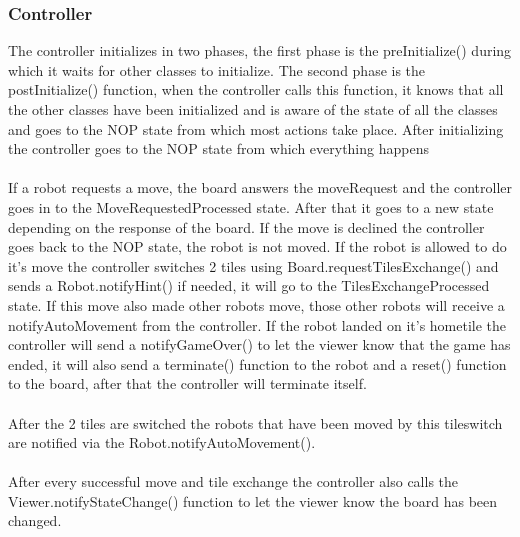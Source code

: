 	\subsubsection{Controller}
	The controller initializes in two phases, the first phase is the preInitialize() during which it waits for other classes to initialize. The second phase is the postInitialize() function, when the controller calls this function, it knows that all the other classes have been initialized and is aware of the state of all the classes and goes to the NOP state from which most actions take place. After initializing the controller goes to the NOP state from which everything happens\\
\\
If a robot requests a move, the board answers the moveRequest and the controller goes in to the MoveRequestedProcessed state. After that it goes to a new state depending on the response of the board. If the move is declined the controller goes back to the NOP state, the robot is not moved. If the robot is allowed to do it's move the controller switches 2 tiles using Board.requestTilesExchange() and sends a Robot.notifyHint() if needed, it will go to the TilesExchangeProcessed state. If this move also made other robots move, those other robots will receive a notifyAutoMovement from the controller. If the robot landed on it's hometile the controller will send a notifyGameOver() to let the viewer know that the game has ended, it will also send a terminate() function to the robot and a reset() function to the board, after that the controller will terminate itself.\\
\\
After the 2 tiles are switched the robots that have been moved by this tileswitch are notified via the Robot.notifyAutoMovement().\\
\\
After every successful move and tile exchange the controller also calls the Viewer.notifyStateChange() function to let the viewer know the board has been changed.\\
